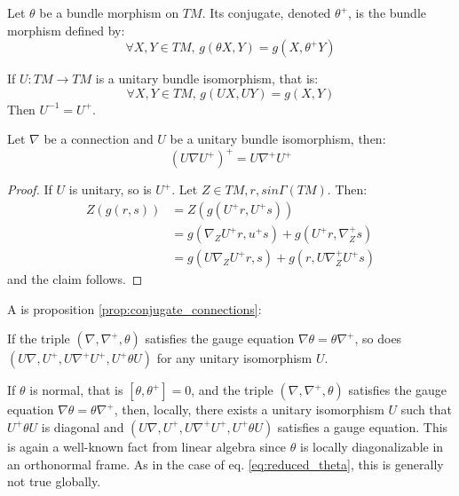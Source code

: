 \begin{defn}
\label{def:endo_conjugate}
Let $\theta$ be a bundle morphism on $TM.$ Its conjugate,
denoted $\theta^+$, is the bundle morphism defined by:
\begin{equation}
    \label{eq:endo_conjugate}
    \forall X,Y \in TM, \, g\left( \theta X, Y\right) = 
    g\left( X, \theta^+ Y\right)
\end{equation}
\end{defn}
\begin{prop}
\label{prop:inverse_unitary}
If $U \colon TM \to TM$ is a unitary bundle isomorphism, that is:
\[
\forall X,Y \in TM, \, g\left( UX, UY \right) = g(X,Y)
\]
Then $U^{-1} = U^+.$
\end{prop}
\begin{prop}
\label{prop:unitary_conjugate}
Let $\nabla$ be a connection and $U$ be a unitary bundle isomorphism, then:
\begin{equation}
\label{eq:unitary_conjugate}
\left(U \nabla U^+\right)^+ = U \nabla^+ U^+
\end{equation}
\end{prop}
\begin{proof}
If $U$ is unitary, so is $U^+.$
Let $Z \in TM, r,s in \Gamma \left( TM \right)$. Then:
\begin{align}
    Z\left(g(r,s) \right) & = Z\left(g(U^+r,U^+s) \right)\\
    &= g\left(\nabla_Z U^+ r,  u^+ s\right) + g\left(U^+ r, \nabla_Z^+s \right) \\
    &= g\left(U \nabla_Z U^+ r , s\right) +
    g\left(r , U \nabla_Z^+ U^+ s\right)
\end{align}
and the claim follows.
\end{proof}
A is proposition \ref{prop:conjugate_connections}:
\begin{prop}
\label{prop:unitary_conjugate_gauge}
If the triple $\left(\nabla,\nabla^+,\theta \right)$ satisfies the gauge equation $\nabla \theta = \theta \nabla^+$, so does  $\left(U \nabla, U^+, U \nabla^+ U^+, U^+ \theta U\right)$ for any unitary isomorphism $U.$
\end{prop}
\begin{rem}
If $\theta$ is normal, that is $\left [ \theta, \theta^+\right ] = 0$, and the triple $\left(\nabla,\nabla^+,\theta \right)$ satisfies the gauge equation $\nabla \theta = \theta \nabla^+$, then, locally, there exists a unitary isomorphism $U$ such that $U^+ \theta U$ is diagonal and $\left(U \nabla, U^+, U \nabla^+ U^+, U^+ \theta U\right)$ satisfies a gauge equation. This is again a well-known fact from linear algebra since $\theta$ is locally diagonalizable in an orthonormal frame. As in the case of eq. \ref{eq:reduced_theta}, this is generally not true globally.
\end{rem}
